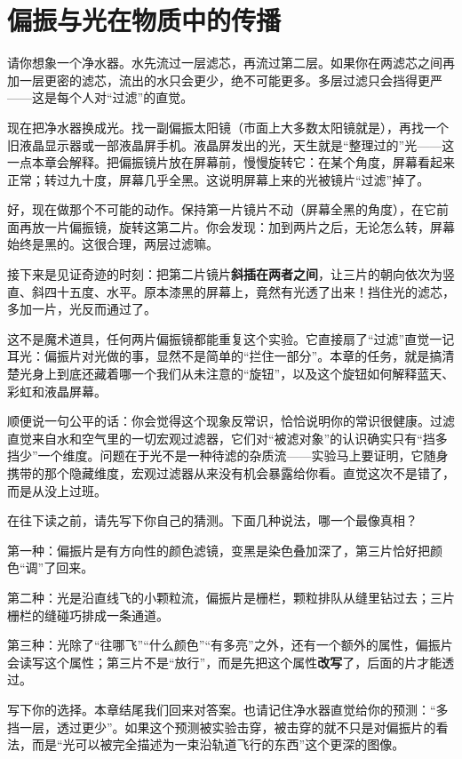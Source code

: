 \chapter{偏振与光在物质中的传播}


请你想象一个净水器。水先流过一层滤芯，再流过第二层。如果你在两滤芯之间再加一层更密的滤芯，流出的水只会更少，绝不可能更多。多层过滤只会挡得更严——这是每个人对“过滤”的直觉。

现在把净水器换成光。找一副偏振太阳镜（市面上大多数太阳镜就是），再找一个旧液晶显示器或一部液晶屏手机。液晶屏发出的光，天生就是“整理过的”光——这一点本章会解释。把偏振镜片放在屏幕前，慢慢旋转它：在某个角度，屏幕看起来正常；转过九十度，屏幕几乎全黑。这说明屏幕上来的光被镜片“过滤”掉了。

好，现在做那个不可能的动作。保持第一片镜片不动（屏幕全黑的角度），在它前面再放一片偏振镜，旋转这第二片。你会发现：加到两片之后，无论怎么转，屏幕始终是黑的。这很合理，两层过滤嘛。

接下来是见证奇迹的时刻：把第二片镜片\textbf{斜插在两者之间}，让三片的朝向依次为竖直、斜四十五度、水平。原本漆黑的屏幕上，竟然有光透了出来！挡住光的滤芯，多加一片，光反而通过了。

这不是魔术道具，任何两片偏振镜都能重复这个实验。它直接扇了“过滤”直觉一记耳光：偏振片对光做的事，显然不是简单的“拦住一部分”。本章的任务，就是搞清楚光身上到底还藏着哪一个我们从未注意的“旋钮”，以及这个旋钮如何解释蓝天、彩虹和液晶屏幕。

顺便说一句公平的话：你会觉得这个现象反常识，恰恰说明你的常识很健康。过滤直觉来自水和空气里的一切宏观过滤器，它们对“被滤对象”的认识确实只有“挡多挡少”一个维度。问题在于光不是一种待滤的杂质流——实验马上要证明，它随身携带的那个隐藏维度，宏观过滤器从来没有机会暴露给你看。直觉这次不是错了，而是从没上过班。


在往下读之前，请先写下你自己的猜测。下面几种说法，哪一个最像真相？

第一种：偏振片是有方向性的颜色滤镜，变黑是染色叠加深了，第三片恰好把颜色“调”了回来。

第二种：光是沿直线飞的小颗粒流，偏振片是栅栏，颗粒排队从缝里钻过去；三片栅栏的缝碰巧排成一条通道。

第三种：光除了“往哪飞”“什么颜色”“有多亮”之外，还有一个额外的属性，偏振片会读写这个属性；第三片不是“放行”，而是先把这个属性\textbf{改写}了，后面的片才能透过。

写下你的选择。本章结尾我们回来对答案。也请记住净水器直觉给你的预测：“多挡一层，透过更少”。如果这个预测被实验击穿，被击穿的就不只是对偏振片的看法，而是“光可以被完全描述为一束沿轨道飞行的东西”这个更深的图像。

